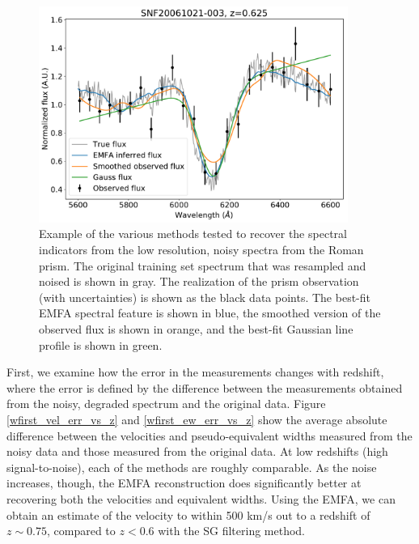 \begin{figure}[htbp]
    \centering
    \includegraphics[width=0.9\textwidth]{figures/si_feat_pca/example_wfirst_emfa_recovery.pdf}
    \caption{Example of the various methods tested to recover the spectral indicators from the low resolution, noisy spectra from the Roman prism. The original training set spectrum that was resampled and noised is shown in gray. The realization of the prism observation (with uncertainties) is shown as the black data points. The best-fit EMFA spectral feature is shown in blue, the smoothed version of the observed flux is shown in orange, and the best-fit Gaussian line profile is shown in green.}
    \label{example_wfirst_recovery}
\end{figure}

First, we examine how the error in the measurements changes with redshift, where the error is defined by the difference between the measurements obtained from the noisy, degraded spectrum and the original data. Figure \ref{wfirst_vel_err_vs_z} and \ref{wfirst_ew_err_vs_z} show the average absolute difference between the velocities and pseudo-equivalent widths measured from the noisy data and those measured from the original data. At low redshifts (high signal-to-noise), each of the methods are roughly comparable. As the noise increases, though, the EMFA reconstruction does significantly better at recovering both the velocities and equivalent widths. Using the EMFA, we can obtain an estimate of the velocity to within 500 km/s out to a redshift of $z\sim0.75$, compared to $z<0.6$ with the SG filtering method. 

